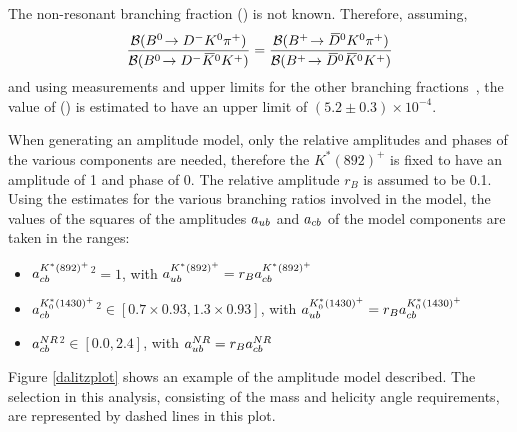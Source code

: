 The non-resonant branching fraction \BR(\decay{\Bp}{\Dzb\KS\pip}) is not known. Therefore, assuming,
\begin{equation*}
\frac{{\mathcal{B}}({{B}^0}\!\rightarrow {\ensuremath{{D}^-}}{\ensuremath{{K}^0}}{\ensuremath{{\pi}^+}})}{{\mathcal{B}}({{B}^0}\!\rightarrow {\ensuremath{{D}^-}}{\ensuremath{{\kern 0.2em\overline{\kern -0.2em K}{}}{}^0}}{\ensuremath{{K}^+}})} = \frac{{\mathcal{B}}({{{B}^+}}\!\rightarrow {\ensuremath{{\kern 0.2em\overline{\kern -0.2em D}{}}{}^0}}{\ensuremath{{K}^0}}{\ensuremath{{\pi}^+}})}{{\mathcal{B}}({{{B}^+}}\!\rightarrow {\ensuremath{{\kern 0.2em\overline{\kern -0.2em D}{}}{}^0}}{\ensuremath{{\kern 0.2em\overline{\kern -0.2em K}{}}{}^0}}{\ensuremath{{K}^+}})}
\end{equation*}
and using measurements and upper limits for the other branching fractions~\cite{PDG2014}, the value of \BR(\decay{\Bp}{\Dzb\KS\pip}) is estimated to have an upper limit of $(5.2 \pm 0.3) \times 10^{-4}$.

When generating an amplitude model, only the relative amplitudes and phases of the various components are needed, therefore the $K^*(892)^+$ is fixed to have an amplitude of 1 and phase of 0. The relative amplitude $r_B$ is assumed to be 0.1. Using the estimates for the various branching ratios involved in the model, the values of the squares of the amplitudes $a_{{u}{b}}$ and $a_{{c}{b}}$ of the model components are taken in the ranges:

\begin{itemize}
\item \textbar $a_{{c}{b}}^{K^*(892)^+}$\textbar$^2 = 1$, \hspace{12pt} with $a_{{u}{b}}^{K^*(892)^+} = r_B a_{{c}{b}}^{K^*(892)^+}$
\item \textbar $a_{{c}{b}}^{K^*_0(1430)^+}$\textbar$^2 \in [0.7 \times 0.93,1.3 \times 0.93]$, \hspace{14pt} with $a_{{u}{b}}^{K^*_0(1430)^+} = r_B a_{{c}{b}}^{K^*_0(1430)^+}$
\item \textbar $a_{{c}{b}}^{NR}$\textbar$^2 \in [0.0,2.4]$, \hspace{12pt} with $a_{{u}{b}}^{NR} = r_B a_{{c}{b}}^{NR}$
\end{itemize}

Figure \ref{dalitzplot} shows an example of the amplitude model described. The \Kstar selection in this analysis, consisting of the \Kstar mass and \KS helicity angle requirements, are represented by dashed lines in this plot.

